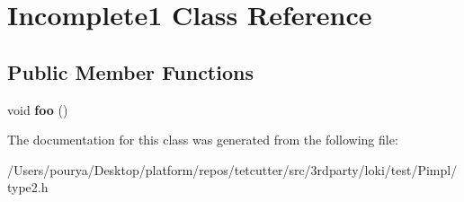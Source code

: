 \hypertarget{classIncomplete1}{}\section{Incomplete1 Class Reference}
\label{classIncomplete1}
\subsection*{Public Member Functions}
\begin{DoxyCompactItemize}
\item 
\hypertarget{classIncomplete1_a60bfc0d43a7ebb41cb26ea99116173b0}{}void {\bfseries foo} ()\label{classIncomplete1_a60bfc0d43a7ebb41cb26ea99116173b0}

\end{DoxyCompactItemize}


The documentation for this class was generated from the following file\+:\begin{DoxyCompactItemize}
\item 
/\+Users/pourya/\+Desktop/platform/repos/tetcutter/src/3rdparty/loki/test/\+Pimpl/type2.\+h\end{DoxyCompactItemize}
